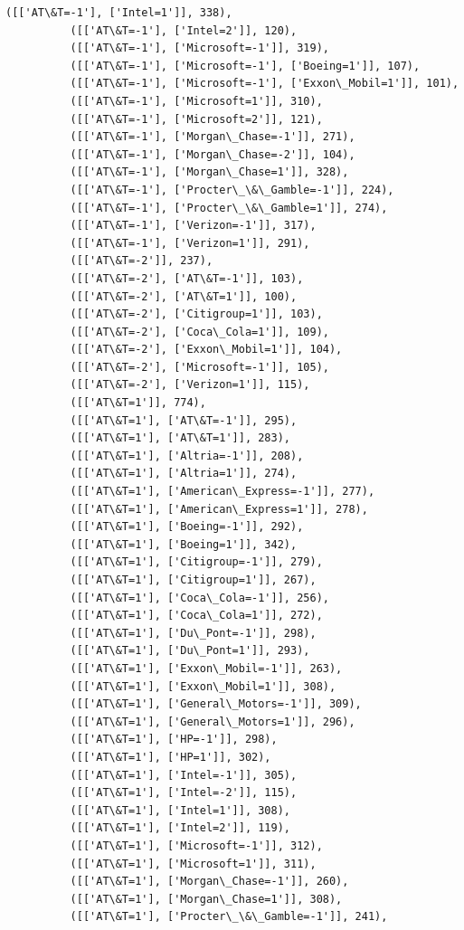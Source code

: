 \documentclass[11pt]{article}
\begin{document}
\begin{Verbatim}[commandchars=\\\{\}]
          ([['AT\&T=-1'], ['Intel=1']], 338),
          ([['AT\&T=-1'], ['Intel=2']], 120),
          ([['AT\&T=-1'], ['Microsoft=-1']], 319),
          ([['AT\&T=-1'], ['Microsoft=-1'], ['Boeing=1']], 107),
          ([['AT\&T=-1'], ['Microsoft=-1'], ['Exxon\_Mobil=1']], 101),
          ([['AT\&T=-1'], ['Microsoft=1']], 310),
          ([['AT\&T=-1'], ['Microsoft=2']], 121),
          ([['AT\&T=-1'], ['Morgan\_Chase=-1']], 271),
          ([['AT\&T=-1'], ['Morgan\_Chase=-2']], 104),
          ([['AT\&T=-1'], ['Morgan\_Chase=1']], 328),
          ([['AT\&T=-1'], ['Procter\_\&\_Gamble=-1']], 224),
          ([['AT\&T=-1'], ['Procter\_\&\_Gamble=1']], 274),
          ([['AT\&T=-1'], ['Verizon=-1']], 317),
          ([['AT\&T=-1'], ['Verizon=1']], 291),
          ([['AT\&T=-2']], 237),
          ([['AT\&T=-2'], ['AT\&T=-1']], 103),
          ([['AT\&T=-2'], ['AT\&T=1']], 100),
          ([['AT\&T=-2'], ['Citigroup=1']], 103),
          ([['AT\&T=-2'], ['Coca\_Cola=1']], 109),
          ([['AT\&T=-2'], ['Exxon\_Mobil=1']], 104),
          ([['AT\&T=-2'], ['Microsoft=-1']], 105),
          ([['AT\&T=-2'], ['Verizon=1']], 115),
          ([['AT\&T=1']], 774),
          ([['AT\&T=1'], ['AT\&T=-1']], 295),
          ([['AT\&T=1'], ['AT\&T=1']], 283),
          ([['AT\&T=1'], ['Altria=-1']], 208),
          ([['AT\&T=1'], ['Altria=1']], 274),
          ([['AT\&T=1'], ['American\_Express=-1']], 277),
          ([['AT\&T=1'], ['American\_Express=1']], 278),
          ([['AT\&T=1'], ['Boeing=-1']], 292),
          ([['AT\&T=1'], ['Boeing=1']], 342),
          ([['AT\&T=1'], ['Citigroup=-1']], 279),
          ([['AT\&T=1'], ['Citigroup=1']], 267),
          ([['AT\&T=1'], ['Coca\_Cola=-1']], 256),
          ([['AT\&T=1'], ['Coca\_Cola=1']], 272),
          ([['AT\&T=1'], ['Du\_Pont=-1']], 298),
          ([['AT\&T=1'], ['Du\_Pont=1']], 293),
          ([['AT\&T=1'], ['Exxon\_Mobil=-1']], 263),
          ([['AT\&T=1'], ['Exxon\_Mobil=1']], 308),
          ([['AT\&T=1'], ['General\_Motors=-1']], 309),
          ([['AT\&T=1'], ['General\_Motors=1']], 296),
          ([['AT\&T=1'], ['HP=-1']], 298),
          ([['AT\&T=1'], ['HP=1']], 302),
          ([['AT\&T=1'], ['Intel=-1']], 305),
          ([['AT\&T=1'], ['Intel=-2']], 115),
          ([['AT\&T=1'], ['Intel=1']], 308),
          ([['AT\&T=1'], ['Intel=2']], 119),
          ([['AT\&T=1'], ['Microsoft=-1']], 312),
          ([['AT\&T=1'], ['Microsoft=1']], 311),
          ([['AT\&T=1'], ['Morgan\_Chase=-1']], 260),
          ([['AT\&T=1'], ['Morgan\_Chase=1']], 308),
          ([['AT\&T=1'], ['Procter\_\&\_Gamble=-1']], 241),

\end{Verbatim}
\end{document}
